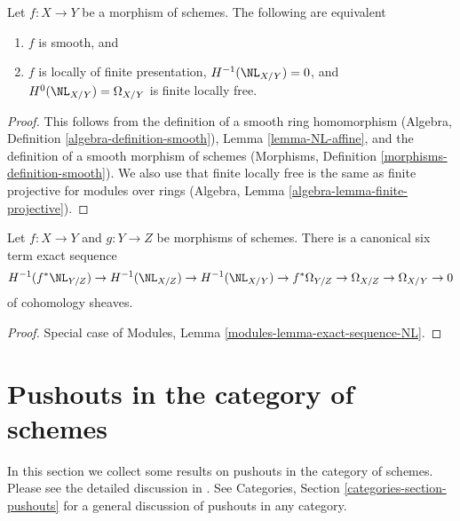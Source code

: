 \begin{lemma}
\label{lemma-NL-smooth}
Let $f : X \to Y$ be a morphism of schemes. The following are equivalent
\begin{enumerate}
\item $f$ is smooth, and
\item $f$ is locally of finite presentation,
$H^{-1}(\NL_{X/Y}) = 0$, and $H^0(\NL_{X/Y}) = \Omega_{X/Y}$
is finite locally free.
\end{enumerate}
\end{lemma}

\begin{proof}
This follows from the definition of a smooth ring homomorphism
(Algebra, Definition \ref{algebra-definition-smooth}),
Lemma \ref{lemma-NL-affine}, and
the definition of a smooth morphism of schemes
(Morphisms, Definition \ref{morphisms-definition-smooth}).
We also use that finite locally free is the same as
finite projective for modules over rings
(Algebra, Lemma \ref{algebra-lemma-finite-projective}).
\end{proof}

\begin{lemma}
\label{lemma-exact-sequence-NL}
Let $f : X \to Y$ and $g : Y \to Z$ be morphisms of schemes.
There is a canonical six term exact sequence
$$
H^{-1}(f^*\NL_{Y/Z}) \to
H^{-1}(\NL_{X/Z}) \to
H^{-1}(\NL_{X/Y}) \to
f^*\Omega_{Y/Z} \to \Omega_{X/Z} \to \Omega_{X/Y} \to 0
$$
of cohomology sheaves.
\end{lemma}

\begin{proof}
Special case of Modules, Lemma \ref{modules-lemma-exact-sequence-NL}.
\end{proof}










\section{Pushouts in the category of schemes}
\label{section-pushouts}

\noindent
In this section we collect some results on pushouts in the category of schemes.
Please see the detailed discussion in \cite{Ferrand-Conducteur}.
See Categories, Section \ref{categories-section-pushouts} for a general
discussion of pushouts in any category.


